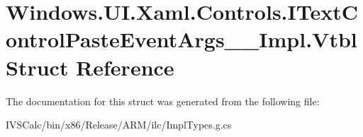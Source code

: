 \hypertarget{struct_windows_1_1_u_i_1_1_xaml_1_1_controls_1_1_i_text_control_paste_event_args_____impl_1_1_vtbl}{}\section{Windows.\+U\+I.\+Xaml.\+Controls.\+I\+Text\+Control\+Paste\+Event\+Args\+\_\+\+\_\+\+Impl.\+Vtbl Struct Reference}
\label{struct_windows_1_1_u_i_1_1_xaml_1_1_controls_1_1_i_text_control_paste_event_args_____impl_1_1_vtbl}


The documentation for this struct was generated from the following file\+:\begin{DoxyCompactItemize}
\item 
I\+V\+S\+Calc/bin/x86/\+Release/\+A\+R\+M/ilc/Impl\+Types.\+g.\+cs\end{DoxyCompactItemize}
